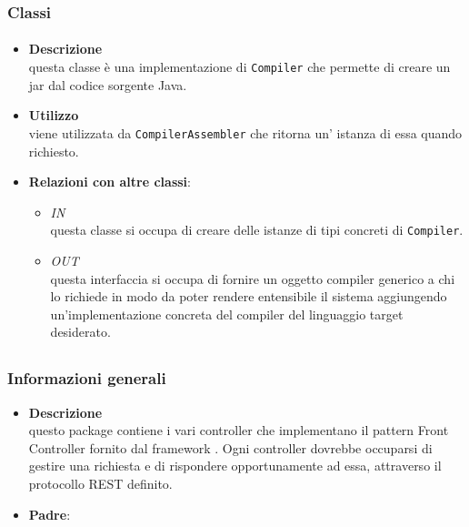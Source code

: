 \subsubsection{Classi}
\paragraph{}
\label{\nogloxy{SWEDesigner::Server::Compiler::Java::JavaCompiler}}
\begin{itemize}
\item \textbf{Descrizione}\\
questa classe è una implementazione di \texttt{Compiler} che permette di creare un jar dal codice sorgente Java.
\item \textbf{Utilizzo}\\
viene utilizzata da \texttt{CompilerAssembler} che ritorna un' istanza di essa quando richiesto.
\item \textbf{Relazioni con altre classi}:
\begin{itemize}
\item \textit{IN} \hyperref[\nogloxy{SWEDesigner::Server::Compiler::CompilerAssembler}]{}\\
questa classe si occupa di creare delle istanze di tipi concreti di \texttt{Compiler}. 
\item \textit{OUT} \hyperref[\nogloxy{SWEDesigner::Server::Compiler::Compiler}]{}\\
questa interfaccia si occupa di fornire un oggetto compiler generico a chi lo richiede in modo da poter rendere entensibile il sistema aggiungendo un'implementazione concreta del compiler del linguaggio target desiderato.
\end{itemize}
\end{itemize}
\subsection{}
\label{\nogloxy{SWEDesigner::Server::Controller}}
\subsubsection{Informazioni generali}
\begin{itemize}
\item \textbf{Descrizione}\\
questo package contiene i vari controller che implementano il pattern Front Controller fornito dal framework \spring{}. Ogni controller dovrebbe occuparsi di gestire una richiesta e di rispondere opportunamente ad essa, attraverso il protocollo REST definito.
\item \textbf{Padre}: \hyperref[\nogloxy{SWEDesigner::Server}]{}
\end{itemize}
